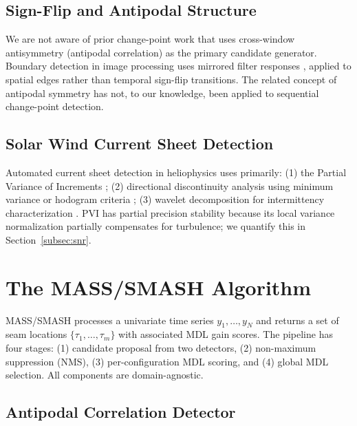 \documentclass[12pt,letterpaper]{article}
\begin{document}
\subsection{Sign-Flip and Antipodal Structure}

We are not aware of prior change-point work that uses cross-window antisymmetry
(antipodal correlation) as the primary candidate generator.
Boundary detection in image processing uses mirrored filter responses
\citep{Canny1986}, applied to spatial edges rather than temporal sign-flip
transitions.
The related concept of antipodal symmetry has not, to our knowledge, been
applied to sequential change-point detection.

\subsection{Solar Wind Current Sheet Detection}

Automated current sheet detection in heliophysics uses primarily:
(1) the Partial Variance of Increments \citep[PVI;][]{Greco2008};
(2) directional discontinuity analysis using minimum variance or hodogram
criteria \citep{Neugebauer1984};
(3) wavelet decomposition for intermittency characterization \citep{Bruno2013}.
PVI has partial precision stability because its local variance normalization
partially compensates for turbulence; we quantify this in
Section~\ref{subsec:snr}.

\section{The MASS/SMASH Algorithm}
\label{sec:algorithm}

MASS/SMASH processes a univariate time series $y_1, \ldots, y_N$ and returns
a set of seam locations $\{\tau_1, \ldots, \tau_m\}$ with associated MDL
gain scores.
The pipeline has four stages: (1) candidate proposal from two detectors,
(2) non-maximum suppression (NMS), (3) per-configuration MDL scoring, and
(4) global MDL selection.
All components are domain-agnostic.

\subsection{Antipodal Correlation Detector}
\label{subsec:antipodal}
\end{document}
